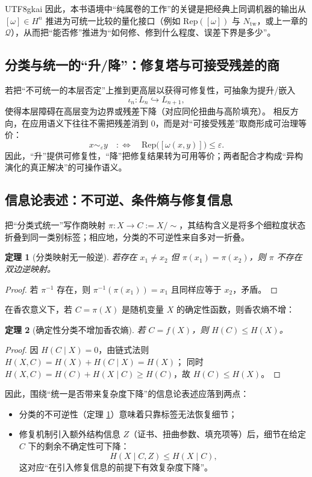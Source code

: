 \documentclass[12pt]{article}
\newtheorem{theorem}{定理}[section]
\begin{document}
\begin{CJK*}{UTF8}{gkai}
因此，本书语境中“纯属卷的工作”的关键是把经典上同调机器的输出从 $[\omega]\in H^n$ 推进为可统一比较的量化接口（例如 $\mathrm{Rep}([\omega])$ 与 $N_{\mathrm{tw}}$，或上一章的
  $\mathcal{Q}$），从而把“能否修”推进为“如何修、修到什么程度、误差下界是多少”。

\subsection{分类与统一的“升/降”：修复塔与可接受残差的商}

若把“不可统一的本层否定”上推到更高层以获得可修复性，可抽象为提升/嵌入
\[
  \iota_n:L_n\hookrightarrow L_{n+1},
\]
使得本层障碍在高层变为边界或残差下降（对应同伦扭曲与高阶填充）。
相反方向，在应用语义下往往不需把残差消到 $0$，而是对“可接受残差”取商形成可治理等价：
\[
  x\sim_\varepsilon y\quad:\Longleftrightarrow\quad \mathrm{Rep}\bigl([\omega(x,y)]\bigr)\le \varepsilon.
\]
因此，“升”提供可修复性，“降”把修复结果转为可用等价；两者配合才构成“异构演化的真正解决”的可操作语义。

\subsection{信息论表述：不可逆、条件熵与修复信息}

把“分类式统一”写作商映射 $\pi:X\to C:=X/{\sim}$，其结构含义是将多个细粒度状态折叠到同一类别标签；相应地，分类的不可逆性来自多对一折叠。

\begin{theorem}[分类映射无一般逆]\label{thm:no-inverse}
若存在 $x_1\neq x_2$ 但 $\pi(x_1)=\pi(x_2)$，则 $\pi$ 不存在双边逆映射。
\end{theorem}

\begin{proof}
若 $\pi^{-1}$ 存在，则 $\pi^{-1}(\pi(x_1))=x_1$ 且同样应等于 $x_2$，矛盾。
\end{proof}

在香农意义下，若 $C=\pi(X)$ 是随机变量 $X$ 的确定性函数，则香农熵不增：

\begin{theorem}[确定性分类不增加香农熵]\label{thm:entropy-noninc}
若 $C=f(X)$，则 $H(C)\le H(X)$。
\end{theorem}

\begin{proof}
因 $H(C\mid X)=0$，由链式法则 $H(X,C)=H(X)+H(C\mid X)=H(X)$；
同时 $H(X,C)=H(C)+H(X\mid C)\ge H(C)$，故 $H(C)\le H(X)$。
\end{proof}

因此，围绕“统一是否带来复杂度下降”的信息论表述应落到两点：
\begin{itemize}
  \item 分类的不可逆性（定理 \ref{thm:no-inverse}）意味着只靠标签无法恢复细节；
  \item 修复机制引入额外结构信息 $Z$（证书、扭曲参数、填充项等）后，细节在给定 $C$ 下的剩余不确定性可下降：
        \[
          H(X\mid C,Z)\le H(X\mid C),
        \]
        这对应“在引入修复信息的前提下有效复杂度下降”。
\end{itemize}


\end{CJK*}
\end{document}
